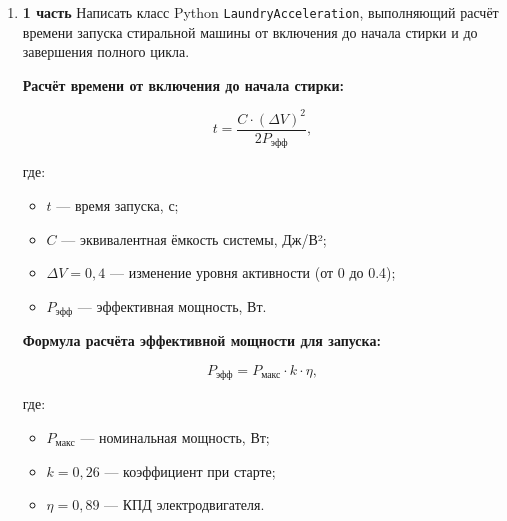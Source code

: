 \begin{enumerate}
\textbf{3 часть}

На основе программного кода и параметров устройств из 2 части текущего практикума отобразить через класс с множественным наследованием \texttt{CoolingAppliance} расчёт времени охлаждения от 4 °C до -18 °C через каждые 4.4 °C, то есть до -0.4, -4.8, -9.2, -13.6 и -18 °C, учитывая, что коэффициент мощности $k = 0{,}60$ увеличивается через каждые 4.4 °C на 0{,}08.

\textbf{Коэффициенты мощности для различных диапазонов температур:}
\begin{itemize}
    \item 4 → -0.4 °C: $k = 0{,}60$;  
    \item -0.4 → -4.8 °C: $k = 0{,}68$;  
    \item -4.8 → -9.2 °C: $k = 0{,}76$;  
    \item -9.2 → -13.6 °C: $k = 0{,}84$;  
    \item -13.6 → -18 °C: $k = 0{,}92$.  
\end{itemize}


\item[26] \textbf{1 часть}  
Написать класс Python \texttt{LaundryAcceleration}, выполняющий расчёт времени запуска стиральной машины от включения до начала стирки и до завершения полного цикла.

\textbf{Расчёт времени от включения до начала стирки:}

\begin{equation}
t = \frac{C \cdot (\Delta V)^2}{2P_{\text{эфф}}},
\end{equation}

где:  
\begin{itemize}
    \item $t$ — время запуска, с;  
    \item $C$ — эквивалентная ёмкость системы, Дж/В²;  
    \item $\Delta V = 0{,}4$ — изменение уровня активности (от 0 до 0.4);  
    \item $P_{\text{эфф}}$ — эффективная мощность, Вт.  
\end{itemize}

\textbf{Формула расчёта эффективной мощности для запуска:}

\begin{equation}
P_{\text{эфф}} = P_{\text{макс}} \cdot k \cdot \eta,
\end{equation}

где:  
\begin{itemize}
    \item $P_{\text{макс}}$ — номинальная мощность, Вт;  
    \item $k = 0{,}26$ — коэффициент при старте;  
    \item $\eta = 0{,}89$ — КПД электродвигателя.  
\end{itemize}


\end{enumerate}
